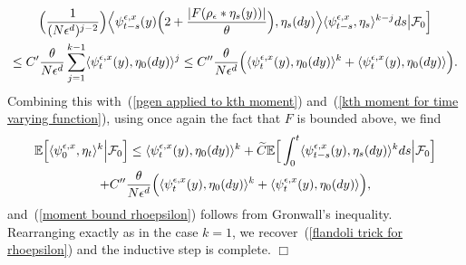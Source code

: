 \documentclass[12pt]{article}
\newenvironment {proof}{{\noindent\bf Proof }}{\hfill $\Box$ \medskip}
\def \tilde{\widetilde}
\newcommand{\IE}{\mathbb E}
\numberwithin{equation}{section}
\begin{document}
\begin{proof}
\begin{multline*}
\Big(\frac{1}{(N\epsilon^d)^{j-2}}\Big)
	\Big\langle \psi^{\epsilon,x}_{t-s}(y)
\Big(2+\frac{|F(\rho_\epsilon*\eta_s(y))|}{\theta}\Big),\eta_s(dy)\Big\rangle
\langle\psi^{\epsilon,x}_{t-s},\eta_s\rangle^{k-j}ds\big|{\cal F}_0\Big]
\\
\leq
C'\frac{\theta}{N\epsilon^d}\sum_{j=1}^{k-1}
\langle\psi^{\epsilon, x}_t(y),\eta_0(dy)\rangle^j
\leq
C''\frac{\theta}{N\epsilon^d}
\Big(\langle\psi^{\epsilon, x}_t(y),\eta_0(dy)\rangle^k
+\langle\psi^{\epsilon, x}_t(y),\eta_0(dy)\rangle\Big).
\end{multline*}
Combining this with~(\ref{pgen applied to kth moment})
and~(\ref{kth moment for time varying function}), using once again the fact that $F$
is bounded above, we find 
\begin{multline*}
\label{kth step of induction}
\IE\Big[\langle \psi^{\epsilon,x}_0,\eta_t\rangle^k\Big|{\cal F}_0\Big]
\leq
\langle\psi^{\epsilon, x}_t(y),\eta_0(dy)\rangle^k
+\tilde{C}\IE\Big[\int_0^t
\langle\psi^{\epsilon, x}_{t-s}(y),\eta_s(dy)\rangle^k ds
\Big|{\cal F}_0\Big]
\\
+C''\frac{\theta}{N\epsilon^d}
\Big(\langle\psi^{\epsilon, x}_t(y),\eta_0(dy)\rangle^k+
\langle\psi^{\epsilon, x}_t(y),\eta_0(dy)\rangle\Big)
,
\end{multline*}
and~(\ref{moment bound rhoepsilon}) 
follows from Gronwall's inequality. Rearranging exactly as in the case $k=1$, we 
recover~(\ref{flandoli trick for rhoepsilon}) 
and the inductive step is complete.
\end{proof}
\end{document}
